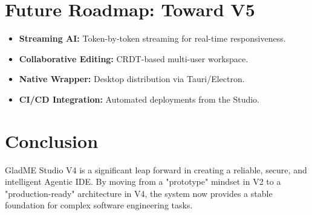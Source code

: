 \documentclass{article}
\begin{document}
\section{Future Roadmap: Toward V5}
\begin{itemize}
    \item \textbf{Streaming AI:} Token-by-token streaming for real-time responsiveness.
    \item \textbf{Collaborative Editing:} CRDT-based multi-user workspace.
    \item \textbf{Native Wrapper:} Desktop distribution via Tauri/Electron.
    \item \textbf{CI/CD Integration:} Automated deployments from the Studio.
\end{itemize}

\section{Conclusion}
GladME Studio V4 is a significant leap forward in creating a reliable, secure, and intelligent Agentic IDE. By moving from a "prototype" mindset in V2 to a "production-ready" architecture in V4, the system now provides a stable foundation for complex software engineering tasks.
\end{document}
